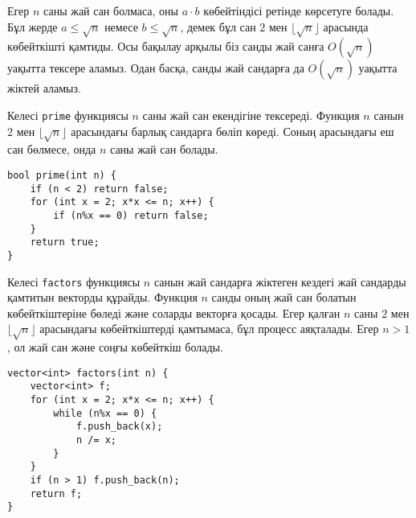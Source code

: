 Егер $n$ саны жай сан болмаса, 
оны $a \cdot b$ көбейтіндісі ретінде 
көрсетуге болады.
Бұл жерде $a \le \sqrt n$ немесе $b \le \sqrt n$, 
демек бұл сан $2$ мен $\lfloor \sqrt n \rfloor$ арасында
көбейткішті қамтиды.
Осы бақылау арқылы біз санды жай санға $O(\sqrt n)$ уақытта
тексере аламыз. Одан басқа, санды жай сандарға да $O(\sqrt n)$
уақытта жіктей аламыз.

Келесі \texttt{prime} функциясы $n$ саны жай сан екендігіне
тексереді. Функция $n$ санын $2$ мен $\lfloor \sqrt n \rfloor$
арасындағы барлық сандарға бөліп көреді. Соның арасындағы
еш сан бөлмесе, онда $n$ саны жай сан болады.

\begin{lstlisting}
bool prime(int n) {
    if (n < 2) return false;
    for (int x = 2; x*x <= n; x++) {
        if (n%x == 0) return false;
    }
    return true;
}
\end{lstlisting}

\noindent
Келесі \texttt{factors} функциясы 
$n$ санын жай сандарға жіктеген кездегі
жай сандарды қамтитын векторды құрайды.
Функция $n$ санды оның жай сан болатын
көбейткіштеріне бөледі және соларды векторға қосады.
Егер қалған $n$ саны
$2$ мен $\lfloor \sqrt n \rfloor$ арасындағы 
көбейткіштерді қамтымаса, бұл процесс аяқталады. Егер $n>1$, 
ол жай сан және соңғы көбейткіш болады.

\begin{lstlisting}
vector<int> factors(int n) {
    vector<int> f;
    for (int x = 2; x*x <= n; x++) {
        while (n%x == 0) {
            f.push_back(x);
            n /= x;
        }
    }
    if (n > 1) f.push_back(n);
    return f;
}
\end{lstlisting}

